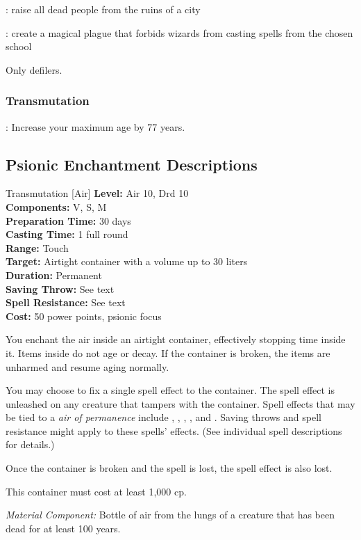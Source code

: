 : raise all dead people from the ruins of a city

: create a magical plague that forbids wizards from casting spells from the chosen school

 Only defilers.


\subsubsection{Transmutation}
: Increase your maximum age by 77 years.


\subsection{Psionic Enchantment Descriptions}

{Transmutation [Air]}
{
    \textbf{Level:}
    Air 10, Drd 10\\
    \textbf{Components:}
    V, S, M\\
    \textbf{Preparation Time:}
    30 days\\
    \textbf{Casting Time:}
    1 full round\\
    \textbf{Range:}
    Touch\\
    \textbf{Target:}
    Airtight container with a volume up to 30 liters\\
    \textbf{Duration:}
    Permanent\\
    \textbf{Saving Throw:}
    See text\\
    \textbf{Spell Resistance:}
    See text\\
    \textbf{Cost:}
    50 power points, psionic focus\\
}
{
    You enchant the air inside an airtight container, effectively stopping time inside it. Items inside do not age or decay. If the container is broken, the items are unharmed and resume aging normally.

    You may choose to fix a single spell effect to the container. The spell effect is unleashed on any creature that tampers with the container. Spell effects that may be tied to a \emph{air of permanence} include , , , , and . Saving throws and spell resistance might apply to these spells' effects. (See individual spell descriptions for details.)

    Once the container is broken and the spell is lost, the spell effect is also lost.

    This container must cost at least 1,000 cp.

    \textit{Material Component:} Bottle of air from the lungs of a creature that has been dead for at least 100 years.
}
